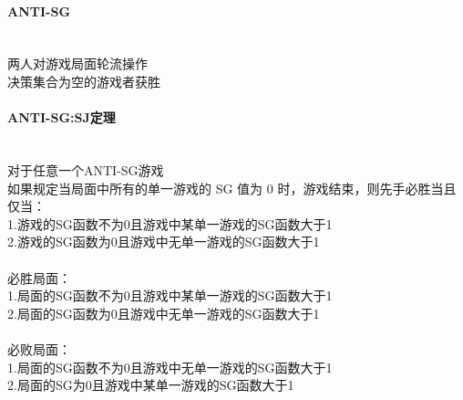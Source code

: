 \paragraph{ANTI-SG}~{}
\\
两人对游戏局面轮流操作\\
决策集合为空的游戏者获胜\\

\paragraph{ANTI-SG:SJ定理}~{}
\\
对于任意一个ANTI-SG游戏\\
如果规定当局面中所有的单一游戏的 SG 值为 0 时，游戏结束，则先手必胜当且仅当：\\
1.游戏的SG函数不为0且游戏中某单一游戏的SG函数大于1\\
2.游戏的SG函数为0且游戏中无单一游戏的SG函数大于1\\
~\\
必胜局面：\\
1.局面的SG函数不为0且游戏中某单一游戏的SG函数大于1\\
2.局面的SG函数为0且游戏中无单一游戏的SG函数大于1\\
~\\
必败局面：\\
1.局面的SG函数不为0且游戏中无单一游戏的SG函数大于1\\
2.局面的SG为0且游戏中某单一游戏的SG函数大于1\\
